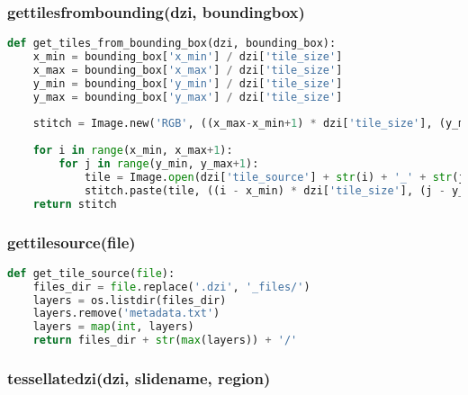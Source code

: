 \subsubsection{get{\textunderscore}tiles{\textunderscore}from{\textunderscore}bounding(dzi, bounding{\textunderscore}box)}

\begin{lstlisting}[frame=single,language=python]
def get_tiles_from_bounding_box(dzi, bounding_box):
	x_min = bounding_box['x_min'] / dzi['tile_size']
	x_max = bounding_box['x_max'] / dzi['tile_size']
	y_min = bounding_box['y_min'] / dzi['tile_size']
	y_max = bounding_box['y_max'] / dzi['tile_size']
	
	stitch = Image.new('RGB', ((x_max-x_min+1) * dzi['tile_size'], (y_max-y_min+1) * dzi['tile_size']))
	
	for i in range(x_min, x_max+1):
		for j in range(y_min, y_max+1):
			tile = Image.open(dzi['tile_source'] + str(i) + '_' + str(j) + '.' + dzi['format'])
			stitch.paste(tile, ((i - x_min) * dzi['tile_size'], (j - y_min) * dzi['tile_size']))
	return stitch
\end{lstlisting}


\subsubsection{get{\textunderscore}tile{\textunderscore}source(file)}

\begin{lstlisting}[frame=single,language=python]
def get_tile_source(file):
	files_dir = file.replace('.dzi', '_files/')
	layers = os.listdir(files_dir)
	layers.remove('metadata.txt')
	layers = map(int, layers)
	return files_dir + str(max(layers)) + '/'
\end{lstlisting}


\subsubsection{tessellate{\textunderscore}dzi(dzi, slide{\textunderscore}name, region)}

